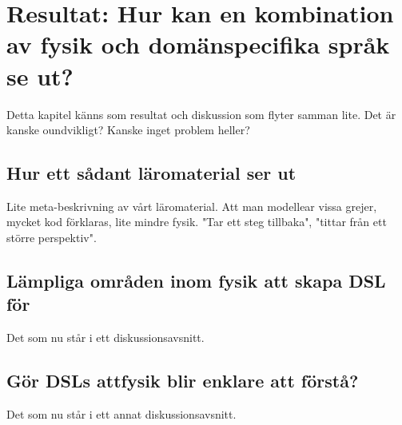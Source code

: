
\chapter{Resultat: Hur kan en kombination av fysik och domänspecifika språk se ut?}
\begin{binge}

Detta kapitel känns som resultat och diskussion som flyter samman lite. Det är kanske oundvikligt? Kanske inget problem heller?

\section{Hur ett sådant läromaterial ser ut}

Lite meta-beskrivning av vårt läromaterial. Att man modellear vissa grejer, mycket kod förklaras, lite mindre fysik. "Tar ett steg tillbaka", "tittar från ett större perspektiv".

\section{Lämpliga områden inom fysik att skapa DSL för}

Det som nu står i ett diskussionsavsnitt.

\section{Gör DSLs attfysik blir enklare att förstå?}

Det som nu står i ett annat diskussionsavsnitt.

\end{binge}

